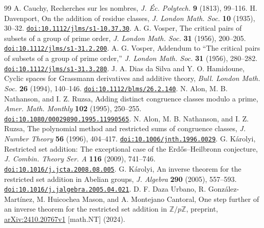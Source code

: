 \documentclass[10pt,a4paper]{amsart}
\begin{document}
\begin{thebibliography}{99}
\fontsize{10}{12}\selectfont
\setlength{\itemsep}{0pt}
\setlength{\parsep}{0pt}
\setlength{\parskip}{0pt}
A. Cauchy, Recherches sur les nombres,
\emph{J. \'Ec. Polytech.} \textbf{9} (1813), 99--116.
H. Davenport, On the addition of residue classes,
\emph{J. London Math. Soc.} \textbf{10} (1935), 30--32.
\href{https://doi.org/10.1112/jlms/s1-10.37.30}{\nolinkurl{doi:10.1112/jlms/s1-10.37.30}}.
A. G. Vosper, The critical pairs of subsets of a group of prime order,
\emph{J. London Math. Soc.} \textbf{31} (1956), 200--205.
\href{https://doi.org/10.1112/jlms/s1-31.2.200}{\nolinkurl{doi:10.1112/jlms/s1-31.2.200}}.
A. G. Vosper, Addendum to ``The critical pairs of subsets of a group of
prime order,'' \emph{J. London Math. Soc.} \textbf{31} (1956), 280--282.
\href{https://doi.org/10.1112/jlms/s1-31.3.280}{\nolinkurl{doi:10.1112/jlms/s1-31.3.280}}.
J. A. Dias da Silva and Y. O. Hamidoune, Cyclic spaces for Grassmann
derivatives and additive theory, \emph{Bull. London Math. Soc.}
\textbf{26} (1994), 140--146.
\href{https://doi.org/10.1112/blms/26.2.140}{\nolinkurl{doi:10.1112/blms/26.2.140}}.
N. Alon, M. B. Nathanson, and I. Z. Ruzsa, Adding distinct congruence
classes modulo a prime, \emph{Amer. Math. Monthly} \textbf{102} (1995), 250--255.
\href{https://doi.org/10.1080/00029890.1995.11990565}{\nolinkurl{doi:10.1080/00029890.1995.11990565}}.
N. Alon, M. B. Nathanson, and I. Z. Ruzsa, The polynomial method and
restricted sums of congruence classes, \emph{J. Number Theory}
\textbf{56} (1996), 404--417.
\href{https://doi.org/10.1006/jnth.1996.0029}{\nolinkurl{doi:10.1006/jnth.1996.0029}}.
G. K\'arolyi, Restricted set addition: The exceptional case of the
Erd\H{o}s--Heilbronn conjecture, \emph{J. Combin. Theory Ser. A}
\textbf{116} (2009), 741--746.
\href{https://doi.org/10.1016/j.jcta.2008.08.005}{\nolinkurl{doi:10.1016/j.jcta.2008.08.005}}.
G. K\'arolyi, An inverse theorem for the restricted set addition in
Abelian groups, \emph{J. Algebra} \textbf{290} (2005), 557--593.
\href{https://doi.org/10.1016/j.jalgebra.2005.04.021}{\nolinkurl{doi:10.1016/j.jalgebra.2005.04.021}}.
D. F. Daza Urbano, R. Gonz\'alez-Mart\'inez, M. Huicochea Mason, and
A. Montejano Cantoral, One step further of an inverse theorem for the
restricted set addition in $\mathbb Z/p\mathbb Z$, preprint,
\href{https://arxiv.org/abs/2410.20767v1}{arXiv:2410.20767v1} [math.NT] (2024).

\end{thebibliography}
\end{document}
